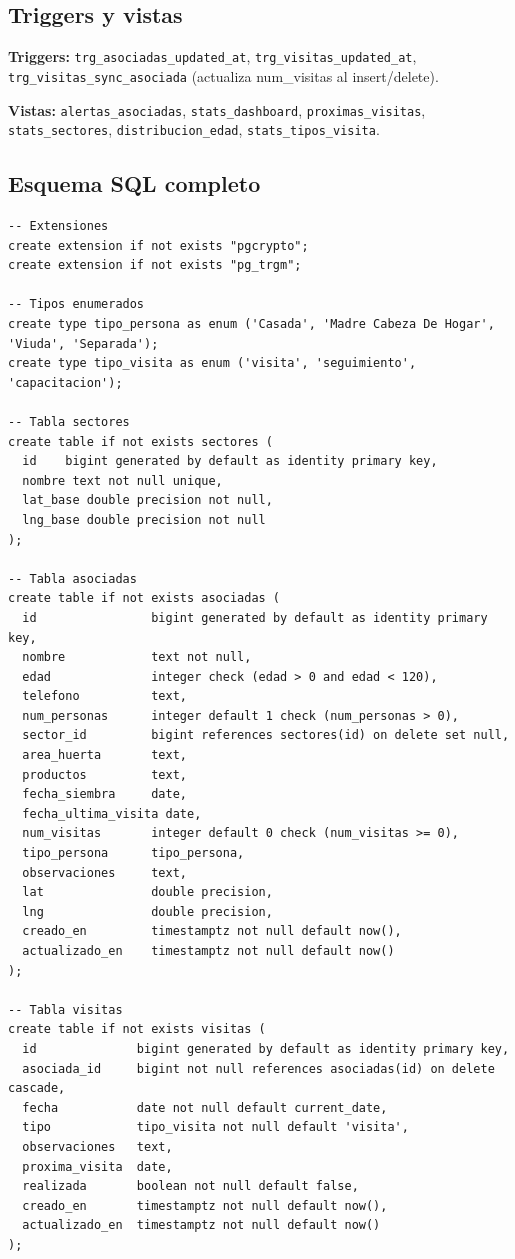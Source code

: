 \documentclass[12pt]{article}
\begin{document}
\subsection{Triggers y vistas}
\textbf{Triggers:} \texttt{trg\_asociadas\_updated\_at}, \texttt{trg\_visitas\_updated\_at}, \texttt{trg\_visitas\_sync\_asociada} (actualiza num\_visitas al insert/delete).

\textbf{Vistas:} \texttt{alertas\_asociadas}, \texttt{stats\_dashboard}, \texttt{proximas\_visitas}, \texttt{stats\_sectores}, \texttt{distribucion\_edad}, \texttt{stats\_tipos\_visita}.

\subsection{Esquema SQL completo}
\begin{lstlisting}[style=sqlstyle]
-- Extensiones
create extension if not exists "pgcrypto";
create extension if not exists "pg_trgm";

-- Tipos enumerados
create type tipo_persona as enum ('Casada', 'Madre Cabeza De Hogar', 'Viuda', 'Separada');
create type tipo_visita as enum ('visita', 'seguimiento', 'capacitacion');

-- Tabla sectores
create table if not exists sectores (
  id    bigint generated by default as identity primary key,
  nombre text not null unique,
  lat_base double precision not null,
  lng_base double precision not null
);

-- Tabla asociadas
create table if not exists asociadas (
  id                bigint generated by default as identity primary key,
  nombre            text not null,
  edad              integer check (edad > 0 and edad < 120),
  telefono          text,
  num_personas      integer default 1 check (num_personas > 0),
  sector_id         bigint references sectores(id) on delete set null,
  area_huerta       text,
  productos         text,
  fecha_siembra     date,
  fecha_ultima_visita date,
  num_visitas       integer default 0 check (num_visitas >= 0),
  tipo_persona      tipo_persona,
  observaciones     text,
  lat               double precision,
  lng               double precision,
  creado_en         timestamptz not null default now(),
  actualizado_en    timestamptz not null default now()
);

-- Tabla visitas
create table if not exists visitas (
  id              bigint generated by default as identity primary key,
  asociada_id     bigint not null references asociadas(id) on delete cascade,
  fecha           date not null default current_date,
  tipo            tipo_visita not null default 'visita',
  observaciones   text,
  proxima_visita  date,
  realizada       boolean not null default false,
  creado_en       timestamptz not null default now(),
  actualizado_en  timestamptz not null default now()
);


\end{lstlisting}
\end{document}

